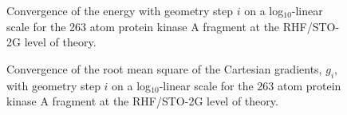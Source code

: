 \documentclass[prl,twocolumn,showpacs,twocolumngrid,superbib]{revtex4}
\begin{document}
\begin{figure}[h]
\caption{
Convergence of the energy with geometry step $i$ on a log$_{10}$-linear  scale for the 
263 atom protein kinase A fragment at the RHF/STO-2G level of theory.}\label{logn-logde} 
\end{figure}

\begin{figure}[h]
\caption{
Convergence of the root mean square of the Cartesian gradients, $g_{i}$,
with geometry step $i$ on a log$_{10}$-linear  scale for the 
263 atom protein kinase A fragment at the RHF/STO-2G level of theory.}\label{gradientpicture} 
\end{figure}
\end{document}
